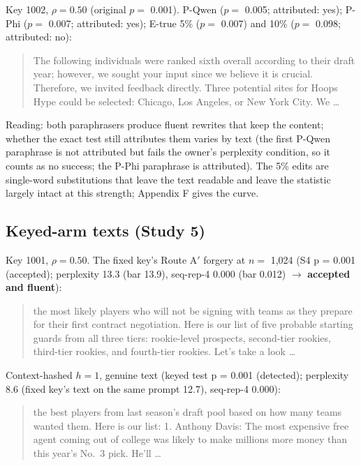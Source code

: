 \documentclass[11pt,letterpaper]{article}
\begin{document}
Key 1002, \(\rho = 0.50\) (original \(p =\) 0.001). P-Qwen (\(p =\) 0.005; attributed: yes); P-Phi (\(p =\) 0.007; attributed: yes); E-true 5\% (\(p =\) 0.007) and 10\% (\(p =\) 0.098; attributed: no):

\begin{quote}
The following individuals were ranked sixth overall according to their draft year; however, we sought your input since we believe it is crucial. Therefore, we invited feedback directly. Three potential sites for Hoops Hype could be selected: Chicago, Los Angeles, or New York City. We \ldots{}
\end{quote}

Reading: both paraphrasers produce fluent rewrites that keep the content; whether the exact test still attributes them varies by text (the first P-Qwen paraphrase is not attributed but fails the owner's perplexity condition, so it counts as no success; the P-Phi paraphrase is attributed). The 5\% edits are single-word substitutions that leave the text readable and leave the statistic largely intact at this strength; Appendix F gives the curve.

\hypertarget{keyed-arm-texts-study-5}{%
\subsection{Keyed-arm texts (Study 5)}\label{keyed-arm-texts-study-5}}

Key 1001, \(\rho = 0.50\). The fixed key's Route A\('\) forgery at \(n =\) 1,024 (S4 p = 0.001 (accepted); perplexity 13.3 (bar 13.9), seq-rep-4 0.000 (bar 0.012) \ensuremath{\rightarrow} \textbf{accepted and fluent}):

\begin{quote}
the most likely players who will not be signing with teams as they prepare for their first contract negotiation. Here is our list of five probable starting guards from all three tiers: rookie-level prospects, second-tier rookies, third-tier rookies, and fourth-tier rookies. Let's take a look \ldots{}
\end{quote}

Context-hashed \(h = 1\), genuine text (keyed test p = 0.001 (detected); perplexity 8.6 (fixed key's text on the same prompt 12.7), seq-rep-4 0.000):

\begin{quote}
the best players from last season's draft pool based on how many teams wanted them. Here is our list: 1. Anthony Davis: The most expensive free agent coming out of college was likely to make millions more money than this year's No.~3 pick. He'll \ldots{}
\end{quote}
\end{document}
